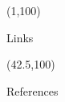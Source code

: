 \documentclass[final]{beamer}
\begin{document}
\begin{frame}{}
    \begin{textblock}{39.5}(1,100)
      \begin{exampleblock}{Links}
        
      \end{exampleblock}
    \end{textblock}

    \begin{textblock}{39.5}(42.5,100)
      \begin{block}{References}
        \small
      \end{block}
    \end{textblock}

  \end{frame}
\end{document}
